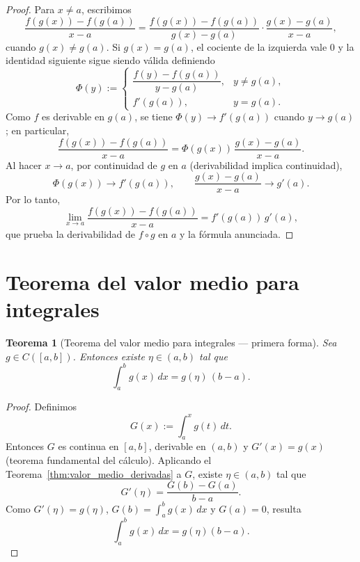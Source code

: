 \documentclass[a4paper,11pt]{report}
\newtheorem{theorem}{Teorema}[chapter]
\begin{document}
\begin{proof}
Para $x\neq a$, escribimos
\[
\frac{f(g(x))-f(g(a))}{x-a}
=\frac{f(g(x))-f(g(a))}{g(x)-g(a)}\cdot\frac{g(x)-g(a)}{x-a},
\]
cuando $g(x)\neq g(a)$. Si $g(x)=g(a)$, el cociente de la izquierda vale $0$ y la identidad siguiente sigue siendo válida definiendo
\[
\Phi(y):=
\begin{cases}
\dfrac{f(y)-f(g(a))}{y-g(a)}, & y\neq g(a),\\[1ex]
f'(g(a)), & y=g(a).
\end{cases}
\]
Como $f$ es derivable en $g(a)$, se tiene $\Phi(y)\to f'(g(a))$ cuando $y\to g(a)$; en particular,
\[
\frac{f(g(x))-f(g(a))}{x-a}=\Phi(g(x))\,\frac{g(x)-g(a)}{x-a}.
\]
Al hacer $x\to a$, por continuidad de $g$ en $a$ (derivabilidad implica continuidad),
\[
\Phi(g(x))\to f'(g(a)),
\qquad
\frac{g(x)-g(a)}{x-a}\to g'(a).
\]
Por lo tanto,
\[
\lim_{x\to a}\frac{f(g(x))-f(g(a))}{x-a}=f'(g(a))\,g'(a),
\]
que prueba la derivabilidad de $f\circ g$ en $a$ y la fórmula anunciada.
\end{proof}

\section{Teorema del valor medio para integrales}

\begin{theorem}[Teorema del valor medio para integrales --- primera forma]\label{thm:valor_medio_integral}
Sea $g\in C([a,b])$.  Entonces existe $\eta\in(a,b)$ tal que
\[
\int_a^b g(x)\,dx = g(\eta)\,(b-a).
\]
\end{theorem}
\begin{proof}
Definimos
\[
G(x):=\int_a^x g(t)\,dt.
\]
Entonces $G$ es continua en $[a,b]$, derivable en $(a,b)$ y $G'(x)=g(x)$ (teorema fundamental del cálculo). Aplicando el Teorema~\ref{thm:valor_medio_derivadas} a $G$, existe $\eta\in(a,b)$ tal que
\[
G'(\eta)=\frac{G(b)-G(a)}{b-a}.
\]
Como $G'(\eta)=g(\eta)$, $G(b)=\int_a^b g(x)\,dx$ y $G(a)=0$, resulta
\[
\int_a^b g(x)\,dx=g(\eta)(b-a).
\]
\end{proof}
\end{document}
